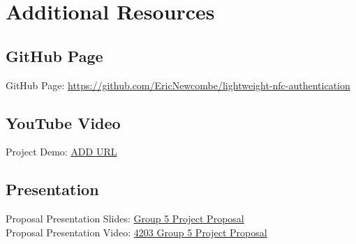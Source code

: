 \section{Additional Resources}

\subsection{GitHub Page}
GitHub Page: {\color{blue}\href{https://github.com/EricNewcombe/lightweight-nfc-authentication}{https://github.com/EricNewcombe/lightweight-nfc-authentication}}

\subsection{YouTube Video}
Project Demo: {\color{blue}\href{<ADD URL>}{ADD URL}}

\subsection{Presentation}
Proposal Presentation Slides: {\color{blue}\href{https://docs.google.com/presentation/d/1XaMSUEic6h73LHT6Pn2JcByK-j4VYvJP/edit}{Group 5 Project Proposal}}\\
Proposal Presentation Video: {\color{blue}\href{https://youtu.be/NOwZpC8iaG8}{4203 Group 5 Project Proposal}}